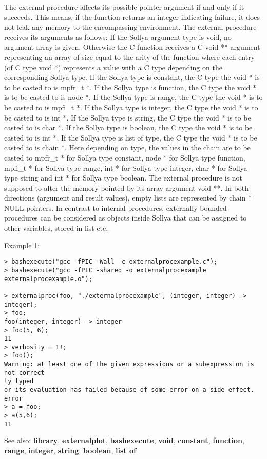 \begin{itemize}
   The external procedure affects its possible pointer argument if and
   only if it succeeds.  This means, if the function returns an integer
   indicating failure, it does not leak any memory to the encompassing
   environment.
   The external procedure receives its arguments as follows: If the
   Sollya argument type is void, no argument array is given.  Otherwise
   the C function receives a C void ** argument representing an array of
   size equal to the arity of the function where each entry (of C type
   void *) represents a value with a C type depending on the
   corresponding Sollya type. If the Sollya type is constant, the C
   type the void * is to be casted to is mpfr\_t *.  If the Sollya type
   is function, the C type the void * is to be casted to is node *.  If
   the Sollya type is range, the C type the void * is to be casted to is
   mpfi\_t *.  If the Sollya type is integer, the C type the void * is to
   be casted to is int *.  If the Sollya type is string, the C type the
   void * is to be casted to is char *.  If the Sollya type is boolean,
   the C type the void * is to be casted to is int *.  If the Sollya
   type is list of type, the C type the void * is to be casted to is
   chain *.  Here depending on type, the values in the chain are to be
   casted to mpfr\_t * for Sollya type constant, node * for Sollya type
   function, mpfi\_t * for Sollya type range, int * for Sollya type
   integer, char * for Sollya type string and int * for Sollya type
   boolean.
   The external procedure is not supposed to alter the memory pointed by
   its array argument void **.
   In both directions (argument and result values), empty lists are
   represented by chain * NULL pointers.
   In contrast to internal procedures, externally bounded procedures can
   be considered as objects inside Sollya that can be assigned to other
   variables, stored in list etc.
\end{itemize}
\noindent Example 1: 
\begin{center}\begin{minipage}{15cm}\begin{Verbatim}[frame=single]
> bashexecute("gcc -fPIC -Wall -c externalprocexample.c");
> bashexecute("gcc -fPIC -shared -o externalprocexample externalprocexample.o");

> externalproc(foo, "./externalprocexample", (integer, integer) -> integer);
> foo;
foo(integer, integer) -> integer
> foo(5, 6);
11
> verbosity = 1!;
> foo();
Warning: at least one of the given expressions or a subexpression is not correct
ly typed
or its evaluation has failed because of some error on a side-effect.
error
> a = foo;
> a(5,6);
11
\end{Verbatim}
\end{minipage}\end{center}
See also: \textbf{library}, \textbf{externalplot}, \textbf{bashexecute}, \textbf{void}, \textbf{constant}, \textbf{function}, \textbf{range}, \textbf{integer}, \textbf{string}, \textbf{boolean}, \textbf{list of}
